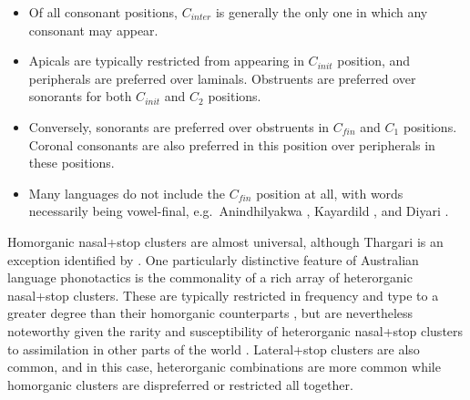 \begin{itemize}
\tightlist
\item
  Of all consonant positions, \(C_{inter}\) is generally the only one in which any consonant may appear.
\item
  Apicals are typically restricted from appearing in \(C_{init}\) position, and peripherals are preferred over laminals. Obstruents are preferred over sonorants for both \(C_{init}\) and \(C_2\) positions.
\item
  Conversely, sonorants are preferred over obstruents in \(C_{fin}\) and \(C_1\) positions. Coronal consonants are also preferred in this position over peripherals in these positions.
\item
  Many languages do not include the \(C_{fin}\) position at all, with words necessarily being vowel-final, e.g.~Anindhilyakwa \autocite{van_egmond_enindhilyakwa_2012}, Kayardild \autocite{evans_grammar_1995}, and Diyari \autocite{austin_grammar_1981}.
\end{itemize}

Homorganic nasal+stop clusters are almost universal, although Thargari \autocite{klokeid_thargari_1969} is an exception identified by \textcite{hamilton_phonetic_1996}. One particularly distinctive feature of Australian language phonotactics is the commonality of a rich array of heterorganic nasal+stop clusters. These are typically restricted in frequency and type to a greater degree than their homorganic counterparts \autocite[pp.~78--82]{hamilton_phonetic_1996}, but are nevertheless noteworthy given the rarity and susceptibility of heterorganic nasal+stop clusters to assimilation in other parts of the world \autocite[p.~144]{baker_word_2014}. Lateral+stop clusters are also common, and in this case, heterorganic combinations are more common while homorganic clusters are dispreferred or restricted all together.

